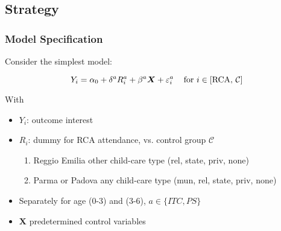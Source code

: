 \subsection{Strategy}

\begin{frame} \frametitle{Model Specification}
Consider the simplest model:

\begin{equation}
Y_{i} = \alpha_0 + \delta^{a} R_{i}^{a} + \beta^{a} \boldsymbol{X} + \varepsilon_{i}^{a}    \hspace{2ex} \text{ for } i \in [\text{RCA, } \mathcal{C}]\label{eq1:OLSreggio}
\end{equation}


With 
\begin{itemize}
	\item $Y_{i}$: outcome interest
	\item $R_{i}$: dummy for RCA attendance, vs. control group $\mathcal{C}$
	\begin{enumerate}
		\item Reggio Emilia \hfill {\scriptsize other child-care type (rel, state, priv, none)}
		\item Parma or Padova \hfill {\scriptsize any child-care type (mun, rel, state, priv, none)}
	\end{enumerate}
	\item Separately for age (0-3) and (3-6), $a \in \{ITC,PS\}$ %
	\item $\boldsymbol{X}$ predetermined control variables

\end{itemize}

\end{frame}

